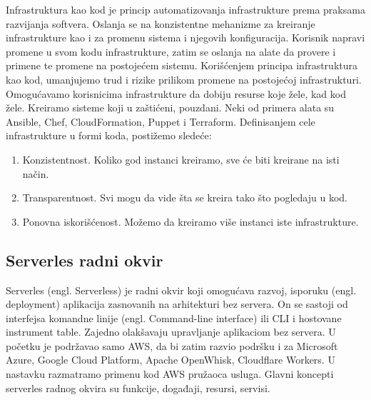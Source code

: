 \documentclass[12pt,oneside]{memoir}
\begin{document}
Infrastruktura kao kod je princip automatizovanja infrastrukture prema praksama razvijanja softvera\cite{iac}. Oslanja se na konzistentne mehanizme za kreiranje infrastrukture kao i za promenu sistema i njegovih konfiguracija. Korisnik napravi promene u svom kodu infrastrukture, zatim se oslanja na alate da provere i primene te promene na postojećem sistemu. Korišćenjem principa infrastruktura kao kod, umanjujemo trud i rizike prilikom promene na postojećoj infrastrukturi. Omogućavamo korisnicima infrastrukture da dobiju resurse koje žele, kad kod žele. Kreiramo sisteme koji u zaštićeni, pouzdani. Neki od primera alata su Ansible, Chef, CloudFormation, Puppet i Terraform. Definisanjem cele infrastrukture u formi koda, postižemo sledeće\cite{iac}:
\begin{enumerate}
  \item Konzistentnost. Koliko god instanci kreiramo, sve će biti kreirane na isti način.
  \item Transparentnost. Svi mogu da vide šta se kreira tako što pogledaju u kod.
  \item Ponovna iskorišćenost. Možemo da kreiramo više instanci iste infrastrukture.
\end{enumerate}
 
\subsection{Serverles radni okvir}
 
Serverles (engl. Serverless) je radni okvir koji omogućava razvoj, isporuku (engl. deployment) aplikacija zasnovanih na arhitekturi bez servera. On se sastoji od interfejsa komandne linije (engl. Command-line interface) ili CLI i hostovane instrument table. Zajedno olakšavaju upravljanje aplikaciom bez servera. U početku je podržavao samo AWS, da bi zatim razvio podršku i za Microsoft Azure, Google Cloud Platform, Apache OpenWhisk, Cloudflare Workers. U nastavku razmatramo primenu kod AWS pružaoca usluga. Glavni koncepti serverles radnog okvira su funkcije, događaji, resursi, servisi. 
 
\end{document}
